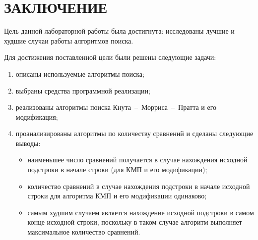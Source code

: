 \chapter*{\hfill{\centering  ЗАКЛЮЧЕНИЕ}\hfill}

Цель данной лабораторной работы была достигнута: исследованы лучшие и худшие случаи работы алгоритмов поиска.

Для достижения поставленной цели были решены следующие задачи:
\begin{enumerate}
	\item описаны используемые алгоритмы поиска;
	\item выбраны средства программной реализации;
	\item реализованы алгоритмы поиска Кнута~--~Морриса~--~Пратта и его модификация;
	\item проанализированы алгоритмы по количеству сравнений и сделаны следующие выводы:
	\begin{itemize}
		\item наименьшее число сравнений получается в случае нахождения исходной подстроки в начале строки (для КМП и его модификации);
		\item количество сравнений в случае нахождения подстроки в начале исходной строки для алгоритма КМП и его модификации одинаково;
		\item самым худшим случаем является нахождение исходной подстроки в самом конце исходной строки, поскольку в таком случае алгоритм выполняет максимальное количество сравнений.
	\end{itemize}
\end{enumerate}
